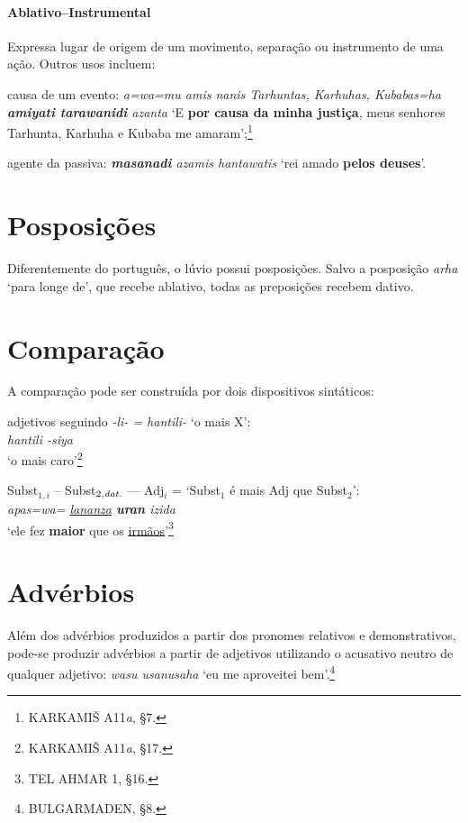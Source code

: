 \paragraph{Ablativo--Instrumental}
Expressa lugar de origem de um movimento, separação ou instrumento de uma ação.
Outros usos incluem:
\begin{inparaenum}[(a)]
	\item causa de um evento:
	\emph{a=wa=mu amis nanis Tarhuntas, Karhuhas, Kubabas=ha
		\textbf{amiyati tara\-wanidi} azanta}
	`E \textbf{por causa da minha justiça}, meus senhores Tarhunta, Kar\-huha e
	Kubaba me amaram';\footnote{KARKAMIŠ A11\emph{a}, §7.}
	\item agente da passiva: \emph{\textbf{masanadi} azamis hantawatis}
	`rei amado
	\textbf{pelos deuses}'.
\end{inparaenum}

\section{Posposições}
Diferentemente do português, o lúvio possui posposições.
Salvo a posposição \emph{arha} `para longe de', que recebe ablativo, todas as
preposições recebem dativo.

\section{Comparação}\label{sec:Comparacao}
A comparação pode ser construída por dois dispositivos sintáticos:
\begin{compactenum}[(a)]
	\item adjetivos seguindo \emph{-li- = hantili-} `o mais X':\\
	\emph{hantili -siya}\\ `o mais caro'\footnote{KARKAMIŠ
		A11\emph{a}, §17.}
	\item Subst$_{1,i}$ -- Subst$_{2,\emph{dat.}}$ --- Adj$_i$ = `Subst$_1$ é mais Adj que Subst$_2$':\\
	\emph{apas=wa= \uline{lananza} \textbf{uran}  izida}\\
	`ele  fez \textbf{maior} que os \uline{irmãos}'\footnote{TEL
		AHMAR 1, §16.}
\end{compactenum}


\section{Advérbios}
Além dos advérbios produzidos a partir dos pronomes relativos e demonstrativos,
pode-se produzir advérbios a partir de adjetivos utilizando o acusativo neutro
de qualquer adjetivo: \emph{wasu usanusaha} `eu me aproveitei
bem'.\footnote{BULGARMADEN, §8.}


